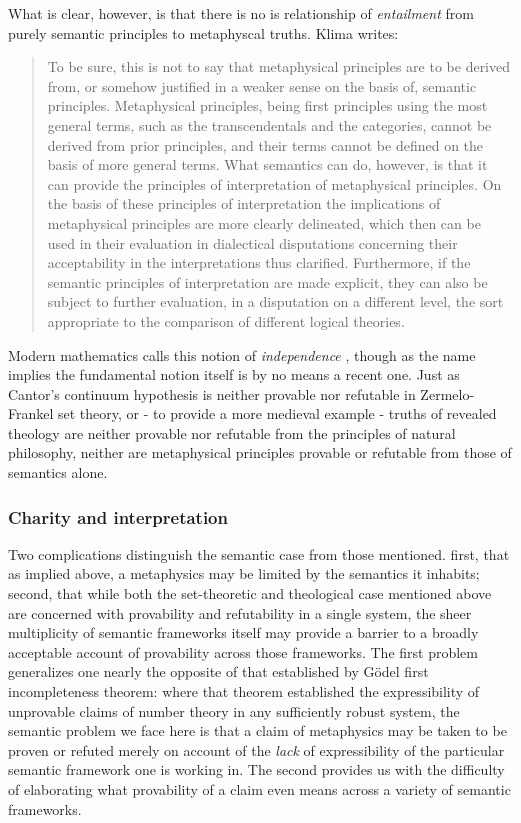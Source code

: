 \documentclass[]{article}
\begin{document}
What is clear, however, is that there is no is relationship of \emph{entailment} from purely semantic principles to metaphyscal truths. Klima writes: 
\begin{quote}
To be sure, this is not to say that metaphysical principles are to be derived from, or somehow justified 
in a weaker sense on the basis of, semantic principles. Metaphysical principles, being first principles 
using the most general terms, such as the transcendentals and the categories, cannot be derived from 
prior principles, and their terms cannot be defined on the basis of more general terms. What 
semantics can do, however, is that it can provide the principles of interpretation of metaphysical 
principles. On the basis of these principles of interpretation the implications of metaphysical 
principles are more clearly delineated, which then can be used in their evaluation in dialectical 
disputations concerning their acceptability in the interpretations thus clarified. Furthermore, if the 
semantic principles of interpretation are made explicit, they can also be subject to further evaluation, 
in a disputation on a different level, the sort appropriate to the comparison of different logical 
theories.  \autocite[49]{Klima2011b}
\end{quote}

Modern mathematics calls this notion of \emph{independence}
, though as the name implies the fundamental notion itself is by no means a recent one. 
Just as Cantor's continuum hypothesis is neither provable nor refutable in Zermelo-Frankel set theory, 
or - to provide a more medieval example - 
truths of revealed theology are neither provable nor refutable from the principles of natural philosophy, 
neither are metaphysical principles provable or refutable from those of semantics alone. 

\subsubsection{Charity and interpretation}
Two complications distinguish the semantic case from those mentioned. 
first, that as implied above, a metaphysics may be limited by the semantics it inhabits;
second, that while both the set-theoretic and theological case mentioned above are concerned with provability and refutability in a single system, 
the sheer multiplicity of semantic frameworks itself may provide a barrier to a broadly acceptable account of provability across those frameworks.
The first problem generalizes one nearly the opposite of that established by G\"{o}del first incompleteness theorem:
where that theorem established the expressibility of unprovable claims of number theory in any sufficiently robust system, 
the semantic problem we face here is that a claim of metaphysics may be taken to be proven or refuted merely on account of the \emph{lack} of expressibility of the particular semantic framework one is working in. 
The second provides us with the difficulty of elaborating what provability of a claim even means across a variety of semantic frameworks.
\end{document}

